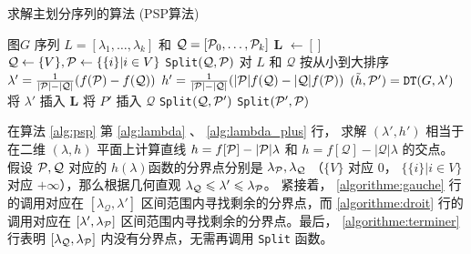 \renewcommand{\algorithmicrequire}{\textbf{输入：}\unskip}
\renewcommand{\algorithmicensure}{\textbf{输出：}\unskip}

\begin{algorithm}[!ht]
  \caption{求解主划分序列的算法 (PSP算法)}
  \label{alg:psp}
  \small
  \begin{algorithmic}[1]
    \REQUIRE 图$G$
    \ENSURE 序列 $L=[\lambda_1, \dots, \lambda_k]$
    和 $\mathcal{Q}=[\P_0, \dots, \P_k]$
    \STATE \textbf{L}  $\leftarrow []$
    \STATE $\mathcal{Q}\leftarrow \{V\}, \P \leftarrow \{ \{i \} | i \in V\}$
    \STATE \texttt{Split}$(\mathcal{Q},\P)$
    \STATE 对 $L$ 和 $\mathcal{Q}$
    按从小到大排序 \footnotemark
     \STATE\label{alg:lambda} $\lambda' =
     {1 \over \abs{\P} - \abs{\mathcal{Q}}}
     (f(\P)-f(\mathcal{Q}))$
     \STATE\label{alg:lambda_plus} $h' = {1 \over \abs{\P} - \abs{\mathcal{Q}}} 
     (\abs{\P} f(\mathcal{Q}) - \abs{\mathcal{Q}} f(\P))$
     \STATE\label{alg:lambda_f} $(\tilde{h}, \P') = \texttt{DT}(G,\lambda')$
       \STATE\label{algorithme:terminer} 将 $\lambda'$ 插入 $\mathbf{L}$
     \ELSE
       \STATE 将 $P'$ 插入 $\mathcal{Q}$
       \STATE\label{algorithme:gauche} \texttt{Split}$(\mathcal{Q}, \P')$
       \STATE\label{algorithme:droit} \texttt{Split}$(\P',\P)$
     \ENDIF
    \ENDFUNCTION
  \end{algorithmic}
\end{algorithm}


在算法 \ref{alg:psp} 第 \ref{alg:lambda} 、 \ref{alg:lambda_plus} 行，
求解 $(\lambda', h')$ 相当于在二维 $(\lambda, h)$
平面上计算直线
$h = f[\P] - |\P| \lambda $
和 $h = f[\mathcal{Q}] - |\mathcal{Q}| \lambda $ 的交点。
假设 $\P, \mathcal{Q}$ 对应的
$h(\lambda)$函数的分界点分别是 $\lambda_{\P}, \lambda_{\mathcal{Q}}$
（$\{V\}$ 对应 0，
$\{\{i\}|i\in V\}$ 对应 $+\infty$），那么根据几何直观
$\lambda_{\mathcal{Q}} \leq \lambda' \leq \lambda_{\P}$。
紧接着， \ref{algorithme:gauche} 行的调用对应在
$[\lambda_{\mathcal{Q}}, \lambda']$
区间范围内寻找剩余的分界点，而
 \ref{algorithme:droit} 行的调用对应在
$[\lambda', \lambda_{\P}]$
区间范围内寻找剩余的分界点。最后，
 \ref{algorithme:terminer} 行表明
$[\lambda_{\mathcal{Q}}, \lambda_{\P}]$ 内没有分界点，无需再调用
\texttt{Split} 函数。

